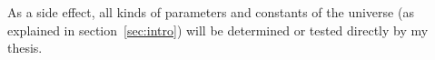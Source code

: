 \documentclass[11pt]{article}
\begin{document}


As a side effect, all kinds of parameters and constants of the universe (as explained in section~\ref{sec:intro}) will be determined or tested directly by my thesis.





\end{document}
